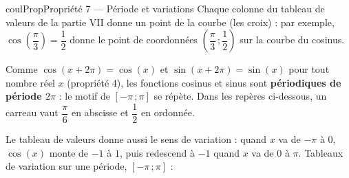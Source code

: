 \documentclass[11pt,a4paper]{article}
\makeatletter
\newcommand{\lycee@intff}[2]{\left[#1\,;#2\right]}
\providecommand{\intff}{\lycee@intff}%
\newcounter{lycee@signet}
\newcommand{\signet}[3][]{\stepcounter{lycee@signet}%
  \edef\lycee@dest{\if\relax\detokenize{#1}\relax
    signet.\arabic{lycee@signet}\else#1\fi}%
  \hypertarget{\lycee@dest}{}\bookmark[level=#2,dest=\lycee@dest]{#3}}
\newenvironment{proprietebox}[1][Propriété]%
  {\begin{boitecours}[phantom={\signet{2}{#1}}]{coulProp}{#1}}{\end{boitecours}}
\makeatother
\begin{document}
\begin{proprietebox}[Propriété 7 --- Période et variations]
Chaque colonne du tableau de valeurs de la partie VII donne un point de la courbe (les
croix) : par exemple, $\cos\left(\dfrac{\pi}{3}\right)=\dfrac{1}{2}$ donne le point de
coordonnées $\left(\dfrac{\pi}{3}\,;\dfrac{1}{2}\right)$ sur la courbe du cosinus.

\smallskip
Comme $\cos(x+2\pi)=\cos(x)$ et $\sin(x+2\pi)=\sin(x)$ pour tout nombre réel $x$
(propriété 4), les fonctions cosinus et sinus sont \textbf{périodiques de période $2\pi$} :
le motif de $\intff{-\pi}{\pi}$ se répète. Dans les repères ci-dessous, un carreau vaut
$\dfrac{\pi}{6}$ en abscisse et $\dfrac{1}{2}$ en ordonnée.
\begin{center}

\medskip
{}
\end{center}
Le tableau de valeurs donne aussi le sens de variation : quand $x$ va de $-\pi$ à $0$,
$\cos(x)$ monte de $-1$ à $1$, puis redescend à $-1$ quand $x$ va de $0$ à $\pi$.
Tableaux de variation sur une période, $\intff{-\pi}{\pi}$ :

\medskip
\begin{minipage}[t]{0.48\linewidth}\centering
{}
\end{minipage}\hfill
\begin{minipage}[t]{0.48\linewidth}\centering
{}
\end{minipage}
\end{proprietebox}
\end{document}
